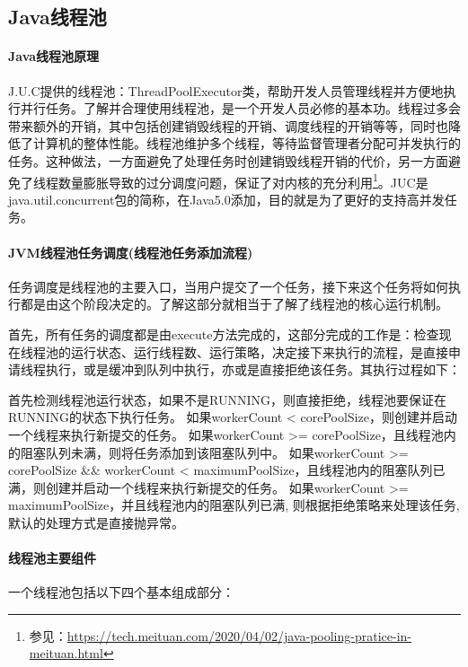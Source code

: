 \documentclass[../../../interview-questions.tex]{subfiles}
\begin{document}
\subsection{Java线程池}

\paragraph{Java线程池原理}

J.U.C提供的线程池：ThreadPoolExecutor类，帮助开发人员管理线程并方便地执行并行任务。了解并合理使用线程池，是一个开发人员必修的基本功。线程过多会带来额外的开销，其中包括创建销毁线程的开销、调度线程的开销等等，同时也降低了计算机的整体性能。线程池维护多个线程，等待监督管理者分配可并发执行的任务。这种做法，一方面避免了处理任务时创建销毁线程开销的代价，另一方面避免了线程数量膨胀导致的过分调度问题，保证了对内核的充分利用\footnote{参见：\url{https://tech.meituan.com/2020/04/02/java-pooling-pratice-in-meituan.html}}。JUC是java.util.concurrent包的简称，在Java5.0添加，目的就是为了更好的支持高并发任务。

\paragraph{JVM线程池任务调度(线程池任务添加流程)}

任务调度是线程池的主要入口，当用户提交了一个任务，接下来这个任务将如何执行都是由这个阶段决定的。了解这部分就相当于了解了线程池的核心运行机制。

首先，所有任务的调度都是由execute方法完成的，这部分完成的工作是：检查现在线程池的运行状态、运行线程数、运行策略，决定接下来执行的流程，是直接申请线程执行，或是缓冲到队列中执行，亦或是直接拒绝该任务。其执行过程如下：

首先检测线程池运行状态，如果不是RUNNING，则直接拒绝，线程池要保证在RUNNING的状态下执行任务。
如果workerCount < corePoolSize，则创建并启动一个线程来执行新提交的任务。
如果workerCount >= corePoolSize，且线程池内的阻塞队列未满，则将任务添加到该阻塞队列中。
如果workerCount >= corePoolSize \&\& workerCount < maximumPoolSize，且线程池内的阻塞队列已满，则创建并启动一个线程来执行新提交的任务。
如果workerCount >= maximumPoolSize，并且线程池内的阻塞队列已满, 则根据拒绝策略来处理该任务, 默认的处理方式是直接抛异常。

\paragraph{线程池主要组件}

一个线程池包括以下四个基本组成部分：
\end{document}

